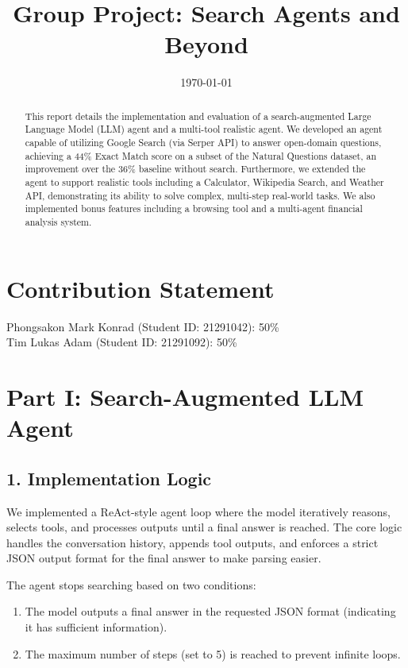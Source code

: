 \documentclass{article}
\title{Group Project: Search Agents and Beyond}
\author{
  Phongsakon Mark Konrad\thanks{Both authors contributed equally to this work.} \\
  SENG, Exchange Student \\
  Hong Kong University of Science and Technology (HKUST) \\
  Clear Water Bay, Hong Kong \\
  Student ID: 21291042 \\
  \texttt{pmkonrad@connect.ust.hk}
  \And
  Tim Lukas Adam\footnote[1] \\ \\
  SENG, Exchange Student \\
  Hong Kong University of Science and Technology (HKUST) \\
  Clear Water Bay, Hong Kong \\
  Student ID: 21291092 \\
  \texttt{tladam@connect.ust.hk}
}
\date{\today}
\begin{document}
\maketitle

\begin{abstract}
This report details the implementation and evaluation of a search-augmented Large Language Model (LLM) agent and a multi-tool realistic agent. We developed an agent capable of utilizing Google Search (via Serper API) to answer open-domain questions, achieving a 44\% Exact Match score on a subset of the Natural Questions dataset, an improvement over the 36\% baseline without search. Furthermore, we extended the agent to support realistic tools including a Calculator, Wikipedia Search, and Weather API, demonstrating its ability to solve complex, multi-step real-world tasks. We also implemented bonus features including a browsing tool and a multi-agent financial analysis system.
\end{abstract}

\section*{Contribution Statement}

Phongsakon Mark Konrad (Student ID: 21291042): 50\% \\

Tim Lukas Adam (Student ID: 21291092): 50\%

\section{Part I: Search-Augmented LLM Agent}

\subsection{1. Implementation Logic}

We implemented a ReAct-style agent loop where the model iteratively reasons, selects tools, and processes outputs until a final answer is reached. The core logic handles the conversation history, appends tool outputs, and enforces a strict JSON output format for the final answer to make parsing easier.

The agent stops searching based on two conditions:
\begin{enumerate}
    \item The model outputs a final answer in the requested JSON format (indicating it has sufficient information).
    \item The maximum number of steps (set to 5) is reached to prevent infinite loops.
\end{enumerate}
\end{document}
